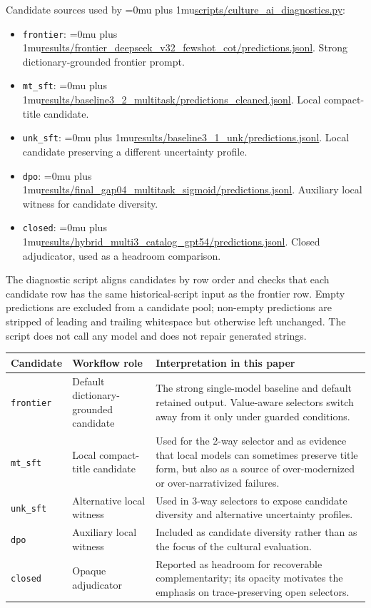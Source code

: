 \documentclass{article}
\newcommand{\code}[1]{\texttt{#1}}
\newcommand{\pathcode}[1]{{\begingroup\Urlmuskip=0mu plus 1mu\url{#1}\endgroup}}
\begin{document}
Candidate sources used by \pathcode{scripts/culture_ai_diagnostics.py}:
\begin{itemize}
    \item \code{frontier}: \pathcode{results/frontier_deepseek_v32_fewshot_cot/predictions.jsonl}. Strong dictionary-grounded frontier prompt.
    \item \code{mt\_sft}: \pathcode{results/baseline3_2_multitask/predictions_cleaned.jsonl}. Local compact-title candidate.
    \item \code{unk\_sft}: \pathcode{results/baseline3_1_unk/predictions.jsonl}. Local candidate preserving a different uncertainty profile.
    \item \code{dpo}: \pathcode{results/final_gap04_multitask_sigmoid/predictions.jsonl}. Auxiliary local witness for candidate diversity.
    \item \code{closed}: \pathcode{results/hybrid_multi3_catalog_gpt54/predictions.jsonl}. Closed adjudicator, used as a headroom comparison.
\end{itemize}

The diagnostic script aligns candidates by row order and checks that each candidate row has the same historical-script input as the frontier row. Empty predictions are excluded from a candidate pool; non-empty predictions are stripped of leading and trailing whitespace but otherwise left unchanged. The script does not call any model and does not repair generated strings.

\begin{longtable}{@{}p{}p{}p{}@{}}
\toprule
Candidate & Workflow role & Interpretation in this paper \\
\midrule
\endhead
\code{frontier} & Default dictionary-grounded candidate & The strong single-model baseline and default retained output. Value-aware selectors switch away from it only under guarded conditions. \\
\code{mt\_sft} & Local compact-title candidate & Used for the 2-way selector and as evidence that local models can sometimes preserve title form, but also as a source of over-modernized or over-narrativized failures. \\
\code{unk\_sft} & Alternative local witness & Used in 3-way selectors to expose candidate diversity and alternative uncertainty profiles. \\
\code{dpo} & Auxiliary local witness & Included as candidate diversity rather than as the focus of the cultural evaluation. \\
\code{closed} & Opaque adjudicator & Reported as headroom for recoverable complementarity; its opacity motivates the emphasis on trace-preserving open selectors. \\
\bottomrule
\end{longtable}
\end{document}
